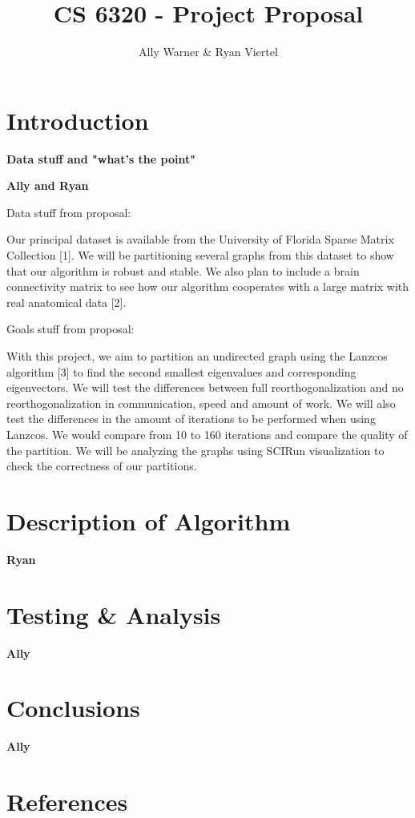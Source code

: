 \documentclass[11pt, oneside]{article}   	%
\title{CS 6320 - Project Proposal}
\author{Ally Warner \& Ryan Viertel}
\begin{document}
\maketitle

\section{Introduction}

\textbf{Data stuff and "what's the point"}

\textbf{Ally and Ryan}

Data stuff from proposal:

Our principal dataset is available from the University of Florida Sparse Matrix Collection [1]. We will be partitioning several graphs from this dataset to show that our algorithm is robust and stable. We also plan to include a brain connectivity matrix to see how our algorithm cooperates with a large matrix with real anatomical data [2]. 

Goals stuff from proposal:

With this project, we aim to partition an undirected graph using the Lanzcos algorithm [3] to find the second smallest eigenvalues and corresponding eigenvectors. We will test the differences between full reorthogonalization and no reorthogonalization in communication, speed and amount of work. We will also test the differences in the amount of iterations to be performed when using Lanzcos. We would compare from 10 to 160 iterations and compare the quality of the partition. We will be analyzing the graphs using SCIRun visualization to check the correctness of our partitions. 

\section{Description of Algorithm}

\textbf{Ryan}

\section{Testing \& Analysis}

\textbf{Ally}

\section{Conclusions}

\textbf{Ally}

\section{References}
\end{document}
